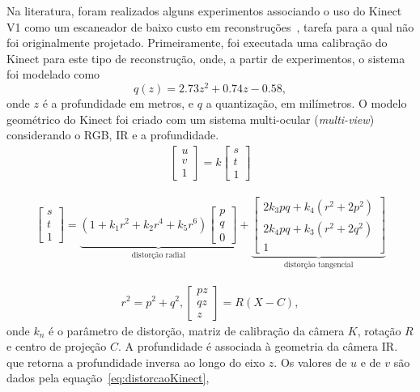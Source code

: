 Na literatura, foram realizados alguns experimentos associando o uso do Kinect V1 como um
escaneador de baixo custo em reconstruções~\cite{smisek20133d}, tarefa para a qual não foi
originalmente projetado. Primeiramente, foi executada uma calibração do
Kinect para este tipo de reconstrução, onde, a partir de experimentos, o sistema
foi modelado como
\begin{equation}
\label{eq:kinectCalibracao}
q(z)=2.73z^{2}+0.74z-0.58,
\end{equation}
onde $z$ é a profundidade em metros, e $q$ a quantização, em milímetros.
O modelo geométrico do Kinect foi criado com um sistema multi-ocular
(\emph{multi-view}) considerando o RGB, IR e a profundidade.
\begin{gather} 
\label{eq:matrix}
\begin{bmatrix}
u\\
v\\
1
\end{bmatrix} 
= k
\begin{bmatrix}
s\\
t\\
1
\end{bmatrix}
\end{gather}

\begin{gather} 
\begin{bmatrix}
s\\
t\\
1
\end{bmatrix} 
= 
\underbrace{(1 + k_1r^2 + k_2r^4 + k_5r^6) 
\begin{bmatrix}
p\\
q\\
0
\end{bmatrix} }_{\text{distorção radial}} 
+
\underbrace{
\begin{bmatrix}
2k_3pq+k_4(r^2+2p^2)\\
2k_4pq+k_3(r^2+2q^2)\\
1
\end{bmatrix} }_{\text{distorção tangencial}}
\label{eq:distorcaoKinect}
\end{gather}

\begin{gather}
r^2 = p^2+q^2, 
\begin{bmatrix}
pz\\ 
qz\\ 
z
\end{bmatrix} = R(X-C),
\label{eq:relacaoKinect}
\end{gather}
onde $k_n$ é o parâmetro de distorção, matriz de calibração da câmera $K$,
rotação $R$ e centro de projeção $C$.
A profundidade é associada à geometria da câmera IR. que retorna a profundidade inversa ao longo do eixo $z$.
Os valores de $u$ e de $v$ são dados pela equação~\ref{eq:distorcaoKinect}, %

